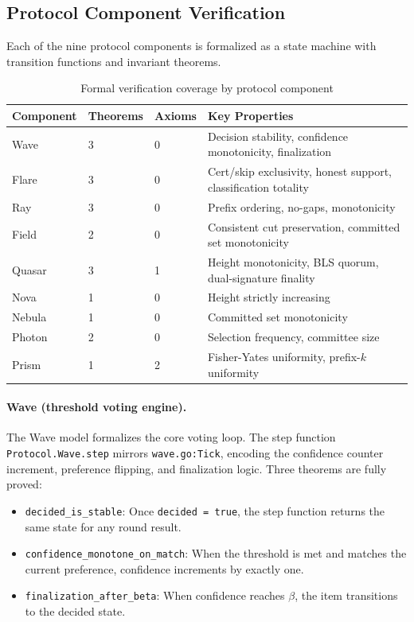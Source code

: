 \documentclass[11pt,a4paper]{article}
\begin{document}
\subsection{Protocol Component Verification}

Each of the nine protocol components is formalized as a state machine with
transition functions and invariant theorems.

\begin{table}[h]
\centering
\caption{Formal verification coverage by protocol component}
\label{tab:formal}
\begin{tabular}{@{}llll@{}}
\toprule
Component & Theorems & Axioms & Key Properties \\
\midrule
Wave     & 3 & 0 & Decision stability, confidence monotonicity, finalization \\
Flare    & 3 & 0 & Cert/skip exclusivity, honest support, classification totality \\
Ray      & 3 & 0 & Prefix ordering, no-gaps, monotonicity \\
Field    & 2 & 0 & Consistent cut preservation, committed set monotonicity \\
Quasar   & 3 & 1 & Height monotonicity, BLS quorum, dual-signature finality \\
Nova     & 1 & 0 & Height strictly increasing \\
Nebula   & 1 & 0 & Committed set monotonicity \\
Photon   & 2 & 0 & Selection frequency, committee size \\
Prism    & 1 & 2 & Fisher-Yates uniformity, prefix-$k$ uniformity \\
\bottomrule
\end{tabular}
\end{table}

\paragraph{Wave (threshold voting engine).}
The Wave model formalizes the core voting loop. The step function \texttt{Protocol.Wave.step}
mirrors \texttt{wave.go:Tick}, encoding the confidence counter increment, preference
flipping, and finalization logic. Three theorems are fully proved:
\begin{itemize}[nosep]
\item \texttt{decided\_is\_stable}: Once \texttt{decided = true}, the step function
returns the same state for any round result.
\item \texttt{confidence\_monotone\_on\_match}: When the threshold is met and matches
the current preference, confidence increments by exactly one.
\item \texttt{finalization\_after\_beta}: When confidence reaches $\beta$, the item
transitions to the decided state.
\end{itemize}
\end{document}
